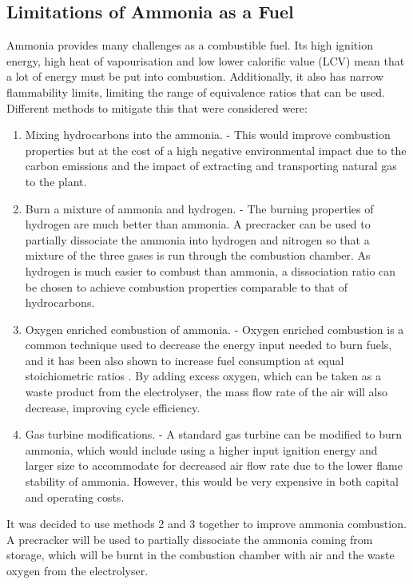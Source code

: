 \documentclass[11pt, oneside]{article}
\begin{document}
\subsection{Limitations of Ammonia as a Fuel \cite{verkamp}}
Ammonia provides many challenges as a combustible fuel. Its high ignition energy, high heat of vapourisation and low lower calorific value (LCV) mean that a lot of energy must be put into combustion. Additionally, it also has narrow flammability limits, limiting the range of equivalence ratios that can be used.  Different methods to mitigate this that were considered were:
\begin {enumerate}
\item Mixing hydrocarbons into the ammonia. - This would improve combustion properties but at the cost of a high negative environmental impact due to the carbon emissions and the impact of extracting and transporting natural gas to the plant. 
\item Burn a mixture of ammonia and hydrogen. - The burning properties of hydrogen are much better than ammonia. A precracker can be used to partially dissociate the ammonia into hydrogen and nitrogen so that a mixture of the three gases is run through the combustion chamber. As hydrogen is much easier to combust than ammonia, a dissociation ratio can be chosen to achieve combustion properties comparable to that of hydrocarbons. \cite{verkamp}
\item Oxygen enriched combustion of ammonia. - Oxygen enriched combustion is a common technique used to decrease the energy input needed to burn fuels, and it has been also shown to increase fuel consumption at equal stoichiometric ratios \cite{baskar}. By adding excess oxygen, which can be taken as a waste product from the electrolyser, the mass flow rate of the air will also decrease, improving cycle efficiency. 
\item Gas turbine modifications. - A standard gas turbine can be modified to burn ammonia, which would include using a higher input ignition energy and larger size to accommodate for decreased air flow rate due to the lower flame stability of ammonia. However, this would be very expensive in both capital and operating costs. \cite{} %
\end {enumerate}

It was decided to use methods 2 and 3 together to improve ammonia combustion. A precracker will be used to partially dissociate the ammonia coming from storage, which will be burnt in the combustion chamber with air and the waste oxygen from the electrolyser.
\end{document}
